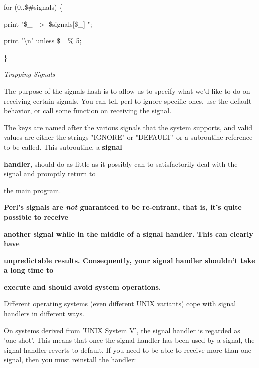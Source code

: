 \documentclass[a4paper,11pt]{book}
\begin{document}
\noindent 

\noindent for (0..\$\#signals) \{

\noindent print "\$\_  -$>$ \$signals[\$\_]  ";

\noindent print "\textbackslash n" unless \$\_  \% 5;

\noindent \}

\noindent 

\noindent \textit{Trapping Signals}

\noindent The purpose of the signals hash is to allow us to specify what we'd like to do on receiving certain signals. You can tell perl to ignore specific ones, use the default behavior, or call some function on receiving the signal.

\noindent 

\noindent The keys are named after the various signals that the system supports, and valid values are either the strings "IGNORE" or "DEFAULT" or a subroutine reference to be called. This subroutine, a \textbf{signal}

\noindent \textbf{handler}, should do as little as it possibly can to satisfactorily deal with the signal and promptly return to

\noindent the main program.

\noindent 

\noindent 

\noindent \textbf{Perl's signals are \textit{not }guaranteed to be re-entrant, that is, it's quite possible to receive}

\noindent \textbf{another signal while in the middle of a signal handler. This can clearly have}

\noindent \textbf{unpredictable results. Consequently, your signal handler shouldn't take a long time to}

\noindent \textbf{execute and should avoid system operations.}

\noindent 

\noindent 

\noindent Different operating systems (even different UNIX variants) cope with signal handlers in different ways.

\noindent On systems derived from 'UNIX System V', the signal handler is regarded as 'one-shot'. This means that once the signal handler has been used by a signal, the signal handler reverts to default. If you need to be able to receive more than one signal, then you must reinstall the handler:

\noindent 
\end{document}
